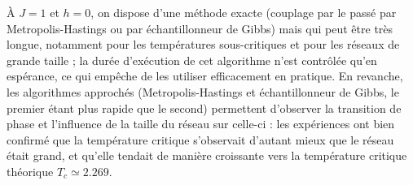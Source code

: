\documentclass[a4paper,11pt]{article}
\begin{document}
À $J = 1$ et $h = 0$, on dispose d'une méthode exacte (couplage par le passé par Metropolis-Hastings ou par échantillonneur de Gibbs) mais qui peut être très longue, notamment pour les températures sous-critiques et pour les réseaux de grande taille ; la durée d'exécution de cet algorithme n'est contrôlée qu'en espérance, ce qui empêche de les utiliser efficacement en pratique. En revanche, les algorithmes approchés (Metropolis-Hastings et échantillonneur de Gibbs, le premier étant plus rapide que le second) permettent d'observer la transition de phase et l'influence de la taille du réseau sur celle-ci : les expériences ont bien confirmé que la température critique s'observait d'autant mieux que le réseau était grand, et qu'elle tendait de manière croissante vers la température critique théorique $T_c \simeq 2.269$.





\nocite{*}


\end{document}
